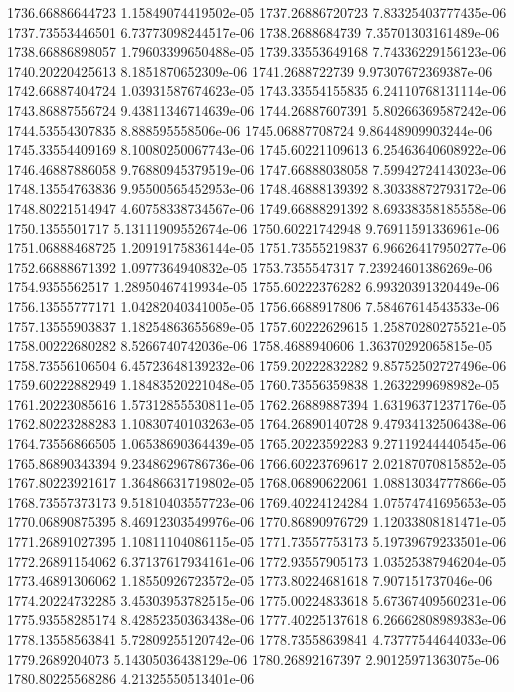{1736.66886644723 1.15849074419502e-05
1737.26886720723 7.83325403777435e-06
1737.73553446501 6.73773098244517e-06
1738.2688684739 7.35701303161489e-06
1738.66886898057 1.79603399650488e-05
1739.33553649168 7.74336229156123e-06
1740.20220425613 8.1851870652309e-06
1741.2688722739 9.97307672369387e-06
1742.66887404724 1.03931587674623e-05
1743.33554155835 6.24110768131114e-06
1743.86887556724 9.43811346714639e-06
1744.26887607391 5.80266369587242e-06
1744.53554307835 8.888595558506e-06
1745.06887708724 9.86448909903244e-06
1745.33554409169 8.10080250067743e-06
1745.60221109613 6.25463640608922e-06
1746.46887886058 9.76880945379519e-06
1747.66888038058 7.59942724143023e-06
1748.13554763836 9.95500565452953e-06
1748.46888139392 8.30338872793172e-06
1748.80221514947 4.60758338734567e-06
1749.66888291392 8.69338358185558e-06
1750.1355501717 5.13111909552674e-06
1750.60221742948 9.76911591336961e-06
1751.06888468725 1.20919175836144e-05
1751.73555219837 6.96626417950277e-06
1752.66888671392 1.0977364940832e-05
1753.7355547317 7.23924601386269e-06
1754.9355562517 1.28950467419934e-05
1755.60222376282 6.99320391320449e-06
1756.13555777171 1.04282040341005e-05
1756.6688917806 7.58467614543533e-06
1757.13555903837 1.18254863655689e-05
1757.60222629615 1.25870280275521e-05
1758.00222680282 8.5266740742036e-06
1758.4688940606 1.36370292065815e-05
1758.73556106504 6.45723648139232e-06
1759.20222832282 9.85752502727496e-06
1759.60222882949 1.18483520221048e-05
1760.73556359838 1.2632299698982e-05
1761.20223085616 1.57312855530811e-05
1762.26889887394 1.63196371237176e-05
1762.80223288283 1.10830740103263e-05
1764.26890140728 9.47934132506438e-06
1764.73556866505 1.06538690364439e-05
1765.20223592283 9.27119244440545e-06
1765.86890343394 9.23486296786736e-06
1766.60223769617 2.02187070815852e-05
1767.80223921617 1.36486631719802e-05
1768.06890622061 1.08813034777866e-05
1768.73557373173 9.51810403557723e-06
1769.40224124284 1.07574741695653e-05
1770.06890875395 8.46912303549976e-06
1770.86890976729 1.12033808181471e-05
1771.26891027395 1.10811104086115e-05
1771.73557753173 5.19739679233501e-06
1772.26891154062 6.37137617934161e-06
1772.93557905173 1.03525387946204e-05
1773.46891306062 1.18550926723572e-05
1773.80224681618 7.907151737046e-06
1774.20224732285 3.45303953782515e-06
1775.00224833618 5.67367409560231e-06
1775.93558285174 8.42852350363438e-06
1777.40225137618 6.26662808989383e-06
1778.13558563841 5.72809255120742e-06
1778.73558639841 4.73777544644033e-06
1779.2689204073 5.14305036438129e-06
1780.26892167397 2.90125971363075e-06
1780.80225568286 4.21325550513401e-06
}

